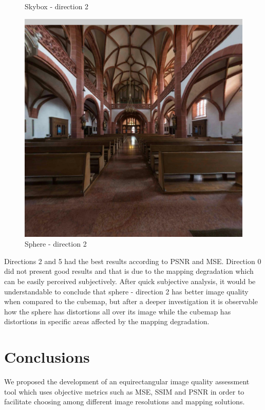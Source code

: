 \documentclass[12pt]{article}
\begin{document}
\begin{figure}[H]
\begin{minipage}[b]{0.3\textwidth}
    \caption{Skybox - direction 2}
    \label{fig:skybox_direction_2}
  \end{minipage}
  \hfill
  \begin{minipage}[b]{0.3\textwidth}
    \centering
    \includegraphics[width=1\textwidth]{../images/screenshots/Screenshot_5_Sphere.jpg}
    \caption{Sphere - direction 2}
    \label{fig:sphere_direction_2}
  \end{minipage}
\end{figure}

Directions 2 and 5 had the best results according to PSNR and MSE. Direction 0 did not present good results and that is due to the mapping degradation which can be easily perceived subjectively. After quick subjective analysis, it would be understandable to conclude that sphere - direction 2 has better image quality when compared to the cubemap, but after a deeper investigation it is observable how the sphere has distortions all over its image while the cubemap has distortions in specific areas affected by the mapping degradation.

\section{Conclusions}
We proposed the development of an equirectangular image quality assessment tool which uses objective metrics such as MSE, SSIM and PSNR in order to facilitate choosing among different image resolutions and mapping solutions.
\end{document}
